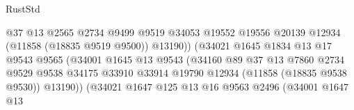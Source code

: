 \begin{lexlean}{RustStd}
\begin{coremodule}
                                              @37
                                              @13
                                              @2565
                                              @2734
                                              @9499
                                              @9519
                                              @34053
                                              @19552
                                              @19556
                                              @20139
                                              @12934
                                              (@11858 (@18835 @9519 @9500))
                                              @13190))
                                          (@34021
                                            @1645
                                            @1834
                                            @13
                                            @17
                                            @9543
                                            @9565
                                            (@34001
                                              @1645
                                              @13
                                              @9543
                                              (@34160
                                                @89
                                                @37
                                                @13
                                                @7860
                                                @2734
                                                @9529
                                                @9538
                                                @34175
                                                @33910
                                                @33914
                                                @19790
                                                @12934
                                                (@11858 (@18835 @9538 @9530))
                                                @13190))
                                            (@34021
                                              @1647
                                              @125
                                              @13
                                              @16
                                              @9563
                                              @2496
                                              (@34001
                                                @1647
                                                @13

\end{coremodule}
\end{lexlean}
